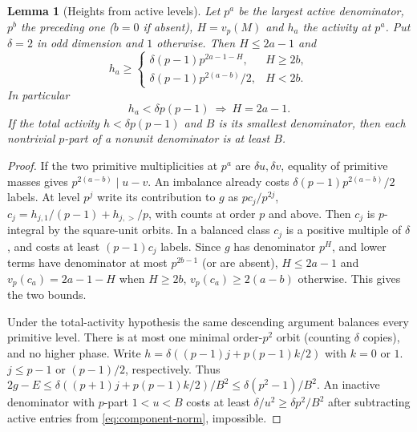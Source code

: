\documentclass[11pt]{amsart}
\numberwithin{equation}{section}
\newtheorem{lemma}[theorem]{Lemma}
\theoremstyle{definition}
\theoremstyle{plain}
\begin{document}
\begin{lemma}[Heights from active levels]\label{result:activity-height-gap}
Let $p^a$ be the largest active denominator, $p^b$ the preceding
one ($b=0$ if absent), $H=v_p(M)$ and $h_a$ the activity at $p^a$.
Put $\delta=2$ in odd dimension and $1$ otherwise. Then $H\le2a-1$
and
\[
 h_a\ge\begin{cases}
 \delta(p-1)p^{2a-1-H},&H\ge2b,\\
 \delta(p-1)p^{2(a-b)}/2,&H<2b.
 \end{cases}
\]
In particular
\begin{equation}\label{eq:sparse-height}
 h_a<\delta p(p-1)\ \Longrightarrow\ H=2a-1 .
\end{equation}
If the total activity $h<\delta p(p-1)$ and $B$ is its smallest
denominator, then each nontrivial $p$-part of a nonunit denominator
is at least $B$.
\end{lemma}
\begin{proof}
If the two primitive multiplicities at $p^a$ are $\delta u,\delta v$,
equality of primitive masses gives $p^{2(a-b)}\mid u-v$.
An imbalance already costs $\delta(p-1)p^{2(a-b)}/2$ labels. At
level $p^j$ write its contribution to $g$ as $pc_j/p^{2j}$,
$c_j=h_{j,1}/(p-1)+h_{j,>}/p$, with counts at order $p$ and
above. Then $c_j$ is $p$-integral by the square-unit orbits. In a
balanced class $c_j$ is a positive multiple of $\delta$, and costs
at least $(p-1)c_j$ labels. Since $g$ has denominator $p^H$, and
lower terms have denominator at most $p^{2b-1}$ (or are absent),
$H\le2a-1$ and $v_p(c_a)=2a-1-H$ when $H\ge2b$,
$ v_p(c_a)\ge2(a-b)$ otherwise. This gives the two bounds.

Under the total-activity hypothesis the same descending argument
balances every primitive level. There is at most one minimal
order-$p^2$ orbit (counting $\delta$ copies), and no higher phase.
Write $h=\delta((p-1)j+p(p-1)k/2)$ with $k=0$ or $1$.
$j\le p-1$ or $(p-1)/2$, respectively. Thus
$2g-E\le\delta((p+1)j+p(p-1)k/2)/B^2
\le\delta(p^2-1)/B^2$. An inactive denominator with $p$-part
$1<u<B$ costs at least $\delta/u^2\ge\delta p^2/B^2$ after
subtracting active entries from \eqref{eq:component-norm}, impossible.
\end{proof}
\end{document}
